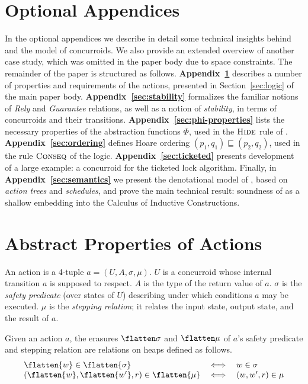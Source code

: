 
\section*{Optional Appendices}

In the optional appendices we describe in detail some technical
insights behind \SCST and the model of concurroids. We also provide an
extended overview of another case study, which was omitted in the
paper body due to space constraints. The remainder of the paper is
structured as follows. \textbf{Appendix~\ref{sec:actions}} describes a
number of properties and requirements of the actions, presented in
Section~\ref{sec:logic} of the main paper
body. \textbf{Appendix~\ref{sec:stability}} formalizes the familiar
notions of \emph{Rely} and \emph{Guarantee} relations, as well as a
notion of \emph{stability}, in terms of concurroids and their
transitions. \textbf{Appendix~\ref{sec:phi-properties}} lists the
necessary properties of the abstraction functions $\Phi$, used in the
$\textsc{Hide}$ rule of \SCST. \textbf{Appendix~\ref{sec:ordering}}
defines Hoare ordering $(p_1, q_1) \sqsubseteq (p_2, q_2)$, used in
the rule $\textsc{Conseq}$ of the
logic. \textbf{Appendix~\ref{sec:ticketed}} presents development of a
large example: a concurroid for the ticketed lock algorithm. Finally,
in \textbf{Appendix~\ref{sec:semantics}} we present the denotational
model of \SCST, based on \emph{action trees} and \emph{schedules}, and
prove the main technical result: soundness of \SCST as a shallow
embedding into the Calculus of Inductive Constructions. 


\section{Abstract Properties of Actions}
\label{sec:actions}

An action is a 4-tuple $a = (U, A, \sigma, \mu)$. $U$ is a concurroid
whose internal transition $a$ is supposed to respect. $A$ is the type
of the return value of $a$. $\sigma$ is the \emph{safety predicate} (over
states of $U$) describing under which conditions $a$ may be
executed. $\mu$ is the \emph{stepping relation}; it relates the input
state, output state, and the result of $a$.

\begin{definition} Given an action $a$, the erasures $\flatten \sigma$ and 
$\flatten \mu$ of $a$'s safety predicate and stepping relation are relations on heaps defined as follows.  
%
{\small
\[
\begin{array}{lcl}
\flatten {w} \in \flatten{\sigma} & \iff & w \in \sigma\\
(\flatten{w}, \flatten{w'}, r) \in \flatten{\mu} & \iff & (w, w', r) \in \mu
\end{array}
\]}
\end{definition}

